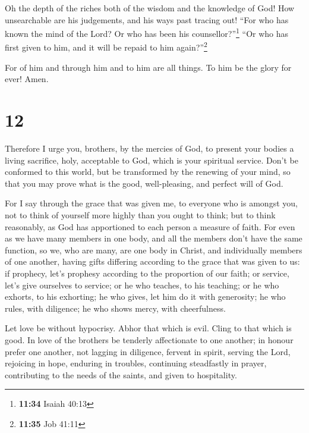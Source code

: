  Oh the depth of the riches both of the wisdom and the
knowledge of God! How unsearchable are his judgements, and his ways past
tracing out!  ``For who has known the mind of the Lord?
Or who has been his counsellor?''\footnote{\textbf{11:34} Isaiah 40:13}
 ``Or who has first given to him, and it will be repaid
to him again?''\footnote{\textbf{11:35} Job 41:11}

 For of him and through him and to him are all things. To
him be the glory for ever! Amen.

\hypertarget{section-11}{%
\section{12}\label{section-11}}

 Therefore I urge you, brothers, by the mercies of God, to
present your bodies a living sacrifice, holy, acceptable to God, which
is your spiritual service.  Don't be conformed to this
world, but be transformed by the renewing of your mind, so that you may
prove what is the good, well-pleasing, and perfect will of God.

 For I say through the grace that was given me, to
everyone who is amongst you, not to think of yourself more highly than
you ought to think; but to think reasonably, as God has apportioned to
each person a measure of faith.  For even as we have many
members in one body, and all the members don't have the same function,
 so we, who are many, are one body in Christ, and
individually members of one another,  having gifts
differing according to the grace that was given to us: if prophecy,
let's prophesy according to the proportion of our faith; 
or service, let's give ourselves to service; or he who teaches, to his
teaching;  or he who exhorts, to his exhorting; he who
gives, let him do it with generosity; he who rules, with diligence; he
who shows mercy, with cheerfulness.

 Let love be without hypocrisy. Abhor that which is evil.
Cling to that which is good.  In love of the brothers be
tenderly affectionate to one another; in honour prefer one another,
 not lagging in diligence, fervent in spirit, serving the
Lord,  rejoicing in hope, enduring in troubles,
continuing steadfastly in prayer,  contributing to the
needs of the saints, and given to hospitality.

